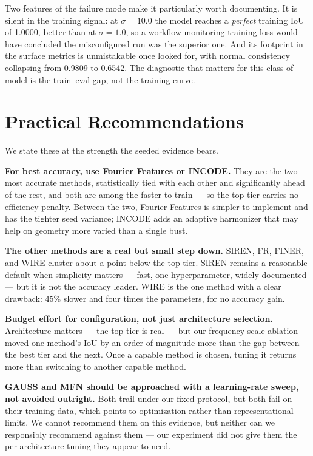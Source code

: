 Two features of the failure mode make it particularly worth documenting. It is silent in the training signal: at $\sigma = 10.0$ the model reaches a \emph{perfect} training IoU of 1.0000, better than at $\sigma = 1.0$, so a workflow monitoring training loss would have concluded the misconfigured run was the superior one. And its footprint in the surface metrics is unmistakable once looked for, with normal consistency collapsing from 0.9809 to 0.6542. The diagnostic that matters for this class of model is the train--eval gap, not the training curve.

\section{Practical Recommendations}

We state these at the strength the seeded evidence bears.

\textbf{For best accuracy, use Fourier Features or INCODE.} They are the two most accurate methods, statistically tied with each other and significantly ahead of the rest, and both are among the faster to train --- so the top tier carries no efficiency penalty. Between the two, Fourier Features is simpler to implement and has the tighter seed variance; INCODE adds an adaptive harmonizer that may help on geometry more varied than a single bust.

\textbf{The other methods are a real but small step down.} SIREN, FR, FINER, and WIRE cluster about a point below the top tier. SIREN remains a reasonable default when simplicity matters --- fast, one hyperparameter, widely documented --- but it is not the accuracy leader. WIRE is the one method with a clear drawback: 45\% slower and four times the parameters, for no accuracy gain.

\textbf{Budget effort for configuration, not just architecture selection.} Architecture matters --- the top tier is real --- but our frequency-scale ablation moved one method's IoU by an order of magnitude more than the gap between the best tier and the next. Once a capable method is chosen, tuning it returns more than switching to another capable method.

\textbf{GAUSS and MFN should be approached with a learning-rate sweep, not avoided outright.} Both trail under our fixed protocol, but both fail on their training data, which points to optimization rather than representational limits. We cannot recommend them on this evidence, but neither can we responsibly recommend against them --- our experiment did not give them the per-architecture tuning they appear to need.

